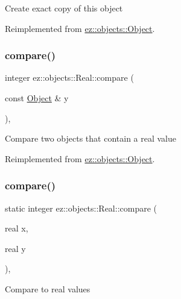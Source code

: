 Create exact copy of this object 

Reimplemented from \hyperlink{classez_1_1objects_1_1Object_acf444b2581d898eb4b8c92c2d5865c9e}{ez\+::objects\+::\+Object}.

\mbox{\label{classez_1_1objects_1_1Real_ab5876f5ce73db15906113a2651453eca}} 
\subsubsection{\texorpdfstring{compare()}{compare()}\hspace{0.1cm}{\footnotesize\ttfamily [1/2]}}
{\footnotesize\ttfamily integer ez\+::objects\+::\+Real\+::compare (\begin{DoxyParamCaption}\item[{const \hyperlink{classez_1_1objects_1_1Object}{Object} \&}]{y }\end{DoxyParamCaption})\hspace{0.3cm}{\ttfamily [inline]}, {\ttfamily [virtual]}}

Compare two objects that contain a real value 

Reimplemented from \hyperlink{classez_1_1objects_1_1Object_aca311d389dffa204e425463145f4e1e6}{ez\+::objects\+::\+Object}.

\mbox{\label{classez_1_1objects_1_1Real_ae4f22d945b157de3bde39c0535930502}} 
\subsubsection{\texorpdfstring{compare()}{compare()}\hspace{0.1cm}{\footnotesize\ttfamily [2/2]}}
{\footnotesize\ttfamily static integer ez\+::objects\+::\+Real\+::compare (\begin{DoxyParamCaption}\item[{real}]{x,  }\item[{real}]{y }\end{DoxyParamCaption})\hspace{0.3cm}{\ttfamily [inline]}, {\ttfamily [static]}}

Compare to real values \mbox{\label{classez_1_1objects_1_1Real_a320dda2159c26b94293767e33f89de91}} 
